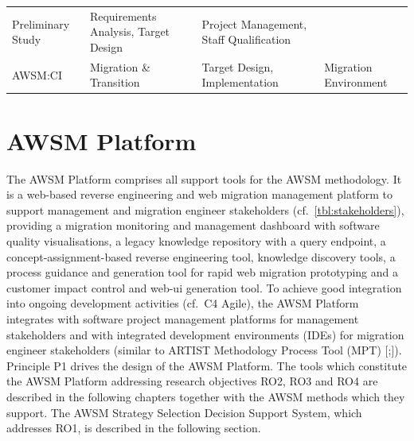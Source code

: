 \begin{longtable}[]{@{}llll@{}}
\begin{minipage}[t]{0.15\columnwidth}
Preliminary Study\strut
\end{minipage} & \begin{minipage}[t]{0.26\columnwidth}\raggedright
Requirements Analysis, Target Design\strut
\end{minipage} & \begin{minipage}[t]{0.41\columnwidth}\raggedright
Project Management, Staff Qualification\strut
\end{minipage}\tabularnewline
\begin{minipage}[t]{0.07\columnwidth}\raggedright
AWSM:CI\strut
\end{minipage} & \begin{minipage}[t]{0.15\columnwidth}\raggedright
Migration \& Transition\strut
\end{minipage} & \begin{minipage}[t]{0.26\columnwidth}\raggedright
Target Design, Implementation\strut
\end{minipage} & \begin{minipage}[t]{0.41\columnwidth}\raggedright
Migration Environment\strut
\end{minipage}\tabularnewline
\bottomrule
\end{longtable}

\hypertarget{sec:platform}{%
\section{AWSM Platform}\label{sec:platform}}

The AWSM Platform comprises all support tools for the AWSM methodology.
It is a web-based reverse engineering and web migration management platform to support management and migration engineer stakeholders (cf.~\cref{tbl:stakeholders}), providing a migration monitoring and management dashboard with software quality visualisations, a legacy knowledge repository with a query endpoint, a concept-assignment-based reverse engineering tool, knowledge discovery tools, a process guidance and generation tool for rapid web migration prototyping and a customer impact control and web-ui generation tool.
To achieve good integration into ongoing development activities (cf.~C4 Agile), the AWSM Platform integrates with software project management platforms for management stakeholders and with integrated development environments (IDEs) for migration engineer stakeholders (similar to ARTIST Methodology Process Tool (MPT)
{[}\textcite{ARTIST2015ProcessFramework};\textcite{Menychtas2014ARTISTJournal}{]}).
Principle P1 drives the design of the AWSM Platform.
The tools which constitute the AWSM Platform addressing research objectives RO2, RO3 and RO4 are described in the following chapters together with the AWSM methods which they support.
The AWSM Strategy Selection Decision Support System, which addresses RO1, is described in the following section.

